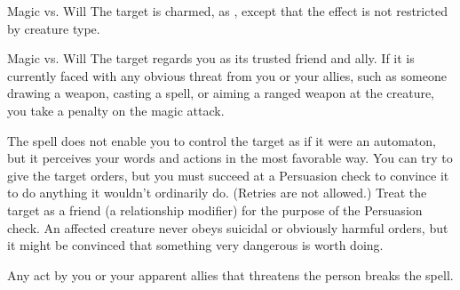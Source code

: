 \begin{spellheader}
    \spellrng{\rngmed}
    \spelldur{\durlong}
\end{spellheader}
\begin{spelleffects}
    \begin{spellattack}{Magic vs. Will}
        \spellsuccess The target is charmed, as , except that the effect is not restricted by creature type.
    \end{spellattack}
\end{spelleffects}
\begin{spellfooter}

\end{spellfooter}

\begin{spellheader}
    \spellrng{\rngmed}
    \spelldur{\durlong}
\end{spellheader}
\begin{spelleffects}
    \begin{spellattack}{Magic vs. Will}
        \spellsuccess The target regards you as its trusted friend and ally. If it is currently faced with any obvious threat from you or your allies, such as someone drawing a weapon, casting a spell, or aiming a ranged weapon at the creature, you take a  penalty on the magic attack.
        \par The spell does not enable you to control the target as if it were an automaton, but it perceives your words and actions in the most favorable way. You can try to give the target orders, but you must succeed at a Persuasion check to convince it to do anything it wouldn't ordinarily do. (Retries are not allowed.) Treat the target as a friend (a  relationship modifier) for the purpose of the Persuasion check. An affected creature never obeys suicidal or obviously harmful orders, but it might be convinced that something very dangerous is worth doing.
    \end{spellattack}
\end{spelleffects}
\begin{spellfooter}
    \spellnotes Any act by you or your apparent allies that threatens the  person breaks the spell.

    \norepeatspellnotes
\end{spellfooter}

